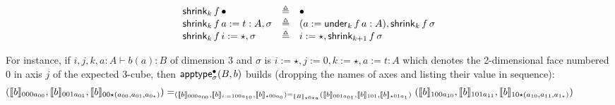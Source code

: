 \documentclass{article}
\newcommand{\sort}[1]{\mathsf{U}_{#1}}
\newcommand{\defeq}{\triangleq}
\begin{document}
$$
\begin{array}{lcll}
\shrink{k}{f}{\emptysigma} & \defeq & \emptysigma\\
\shrink{k}{f}{a:=t:A,\sigma} & \defeq & (a:=\under{k}{f}{a}:A),\shrink{k}{f}{\sigma}\\
\shrink{k}{f}{i:=\star,\sigma} & \defeq & i:=\star,\shrink{k+1}{f}{\sigma}\\
\end{array}
$$

For instance, if $i,j,k,a:A \vdash b(a):B$ of dimension 3 and $\sigma$ is
$i:=\star,j:=0,k:=\star,a:=t:A$ which denotes the 2-dimensional face numbered
$0$ in axis $j$ of the expected $3$-cube, then
$\mathsf{apptype}_{\sigma}^{\bullet}(B,b)$ builds (dropping the names of
axes and listing their value in sequence):
$$\!\!\!\!\!\!\!\!\!\!\!\!\!\!\!\!\!\!\!\!\!\!\!\!(\semnew{000a_{00}}{b},\semnew{001a_{01}}{b},\semnew{00\star (a_{00},a_{01},a_{0\star})}{b})
 =_{(\semnew{000 a_{00}}{b},\semnew{i:=100a_{10}}{b},\semnew{\star00a_{0}}{b})
  =_{\semnew{\star0\star a}{B}} (\semnew{001a_{01}}{b},\semnew{101}{b},\semnew{\star01a_{1}}{b})}
(\semnew{100a_{10}}{b},\semnew{101a_{11}}{b},\semnew{10\star (a_{10},a_{11},a_{1\star})}{b})$$
\fi %
\iffalse
\subsection{A ranger}

$$
\begin{array}{lcll}
\reflsort{0} & \defeq & \sort{}\\
\reflsort{n+1} & \defeq & (\lambda A_0:\semsort{n}.\lambda A_1:\semsort{n}.A_0 \simeq A_1,\lambda A:\semsort{n}.A,\lambda A:\semsort{n}.\reflsort{n},...,...,...,...,...,...))\\
\\
\refltypen{n}{(A:\sort{})} & : & A \simeq A\\
\refltypen{n}{A} & \defeq & (\lambda a_0:A.\lambda a_1:A.a_0 =_A a_1,\lambda a_0:A.a_0,\lambda a_0:A.\refltermn{n}{A}{a_0},...,...,...,...,...,...))\\
\\
\# \emptysigma & \defeq & 0\\
\# (\sigma,a:A) & \defeq & \#\sigma\\
\# (\sigma,i:=0) & \defeq & (\#\sigma)\\
\# (\sigma,i:=1) & \defeq & (\#\sigma)\\
\# (\sigma,i:=\star) & \defeq & (\#\sigma) + 1\\
\\
\semctx{\sigma}{i, \Delta} & \defeq &
  \semctx{\sigma, i}{\Delta} \\
\semctx{\sigma}{a:A, \Delta} & \defeq &
  a : \semnew{\sigma}{A}, \semctx{\sigma, a:A}{\Delta} \\
\\
\elt{0}{B} & \defeq & B\\
\elt{n+1}{(B_0,B_1,B_\star)} & \defeq &
  \Sigma b_0:\elt{n}{B_0}.
  \Sigma b_1:\elt{n}{B_1}.
  b_0 =_{B_\star} b_1\\
\end{array}
$$
\fi
\iffalse %
\end{document}
